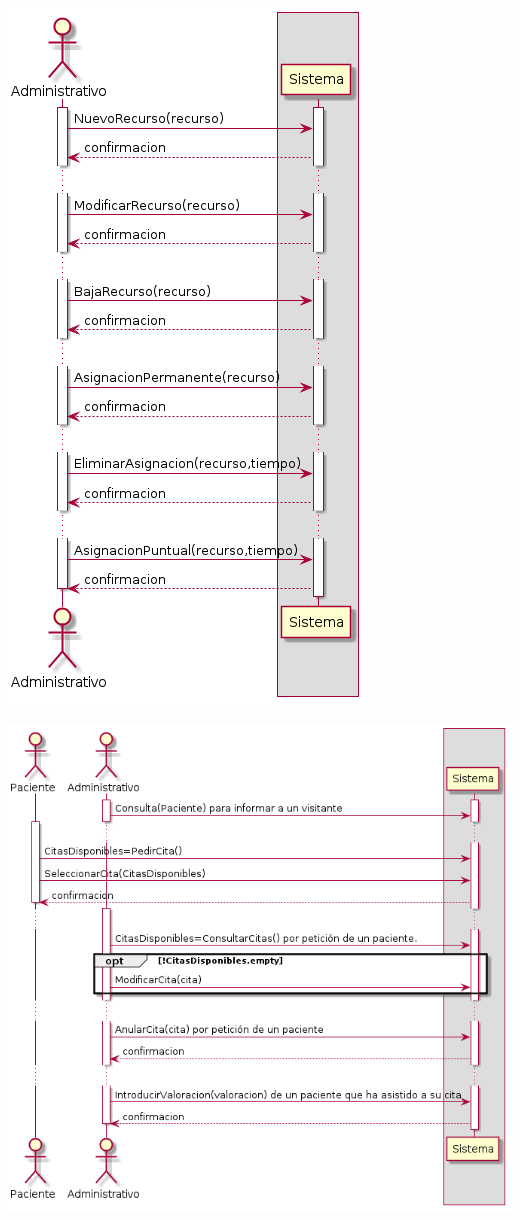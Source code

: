 \documentclass[10pt,a4paper,spanish]{report}
\begin{document}
\begin{center}
\includegraphics[scale=0.50]{GestionDeRecursos.png}

\vspace{0.5cm}

\includegraphics[scale=0.50]{mostradorPacienteConsulta.png}


\end{center}
\end{document}

